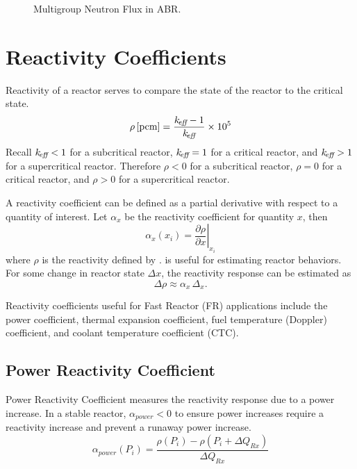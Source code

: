   \begin{figure}
    \centering
    \hspace{0.2in}
    \caption{Multigroup Neutron Flux in ABR.}
    \label{fig:abr_fluxes}
  \end{figure}

\section{Reactivity Coefficients}
\label{sec:reactivity_coefficients}
  Reactivity of a reactor serves to compare the state of the reactor to the
  critical state.
  \begin{equation}
    \label{eq:reactivity}
    \rho \left[\text{{pcm}}\right] = \frac{k_{\!\mbox{\scriptsize \em eff}}-1}{k_{\!\mbox{\scriptsize \em eff}}} \times 10^5
  \end{equation}
  Recall $k_{\!\mbox{\scriptsize \em eff}} < 1$ for a subcritical reactor, $k_{\!\mbox{\scriptsize \em eff}}=1$ for a critical
  reactor, and $k_{\!\mbox{\scriptsize \em eff}} > 1$ for a supercritical reactor. Therefore $\rho < 0$
  for a subcritical reactor, $\rho = 0$ for a critical reactor, and $\rho > 0$
  for a supercritical reactor. 

  A reactivity coefficient can be defined as a partial derivative with respect
  to a quantity of interest. Let $\alpha_x$ be the reactivity coefficient for
  quantity $x$, then
  \begin{equation}
    \label{eq:reactivity_coefficient}
    \alpha_x(x_i) = \left. \frac{\partial \rho}{\partial x} \right|_{x_i}
  \end{equation}
  where $\rho$ is the reactivity defined by .
   is useful for estimating reactor behaviors.
  For some change in reactor state $\Delta x$, the reactivity response can be
  estimated as 
  \begin{equation}
    \label{eq:reactivity_estimate}
    \Delta \rho \approx \alpha_x \, \Delta_x.
  \end{equation}

  Reactivity coefficients useful for Fast Reactor (FR) applications include the
  power coefficient, thermal expansion coefficient, fuel temperature (Doppler)
  coefficient, and coolant temperature coefficient (CTC).

  \subsection{Power Reactivity Coefficient}
  Power Reactivity Coefficient measures the reactivity response due to a power
  increase. In a stable reactor, $\alpha_{power} < 0$ to ensure power increases
  require a reactivity increase and prevent a runaway power increase.
  \begin{equation}
    \label{eq:power_reactivity_coefficient}
    \alpha_{power}(P_i) = \frac{\rho(P_i) - \rho(P_i + \Delta Q_{Rx})}
      {\Delta Q_{Rx}}
  \end{equation}


